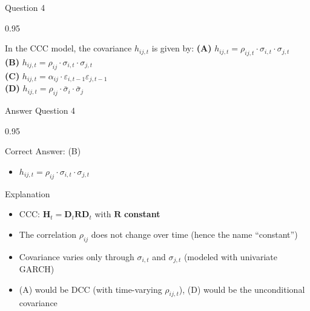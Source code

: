 \documentclass[9pt, aspectratio=169, t]{beamer}
\begin{document}
\begin{frame}{Question 4}
    \begin{cminipage}{0.95\textwidth}
    \begin{block}{In the CCC model, the covariance $h_{ij,t}$ is given by:}
        \textcolor{MainBlue}{\textbf{(A)}} $h_{ij,t} = \rho_{ij,t} \cdot \sigma_{i,t} \cdot \sigma_{j,t}$\\[3pt]
        \textcolor{MainBlue}{\textbf{(B)}} $h_{ij,t} = \rho_{ij} \cdot \sigma_{i,t} \cdot \sigma_{j,t}$\\[3pt]
        \textcolor{MainBlue}{\textbf{(C)}} $h_{ij,t} = \alpha_{ij} \cdot \varepsilon_{i,t-1} \varepsilon_{j,t-1}$\\[3pt]
        \textcolor{MainBlue}{\textbf{(D)}} $h_{ij,t} = \rho_{ij} \cdot \bar{\sigma}_i \cdot \bar{\sigma}_j$
    \end{block}
    \end{cminipage}
\end{frame}

\begin{frame}{Answer Question 4}
    \begin{cminipage}{0.95\textwidth}
    \begin{exampleblock}{Correct Answer: (B)}
        \begin{itemize}\setlength{\itemsep}{0pt}
            \item $h_{ij,t} = \rho_{ij} \cdot \sigma_{i,t} \cdot \sigma_{j,t}$
        \end{itemize}
    \end{exampleblock}

    \pause
    \begin{block}{Explanation}
        \begin{itemize}\setlength{\itemsep}{0pt}
            \item CCC: $\mathbf{H}_t = \mathbf{D}_t \mathbf{R} \mathbf{D}_t$ with $\mathbf{R}$ \textbf{constant}
            \item The correlation $\rho_{ij}$ does not change over time (hence the name ``constant'')
            \item Covariance varies only through $\sigma_{i,t}$ and $\sigma_{j,t}$ (modeled with univariate GARCH)
            \item (A) would be DCC (with time-varying $\rho_{ij,t}$), (D) would be the unconditional covariance
        \end{itemize}
    \end{block}
    \end{cminipage}
\end{frame}
\end{document}
